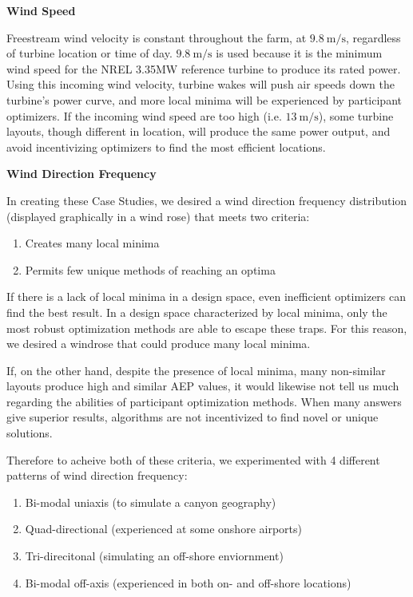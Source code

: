 \vspace{3mm}
\noindent\textbf{Wind Speed}

	\noindent Freestream wind velocity is constant throughout the farm, at $9.8\ \textrm{m/s}$, regardless of turbine location or time of day.
	$9.8\ \textrm{m/s}$ is used because it is the minimum wind speed for the NREL 3.35MW reference turbine to produce its rated power.
	Using this incoming wind velocity, turbine wakes will push air speeds down the turbine's power curve, and more local minima will be experienced by participant optimizers.
	If the incoming wind speed are too high (i.e. $13\ \textrm{m/s}$), some turbine layouts, though different in location, will produce the same power output, and avoid incentivizing optimizers to find the most efficient locations.

\vspace{3mm}
\noindent\textbf{Wind Direction Frequency}

	\noindent In creating these Case Studies, we desired a wind direction frequency distribution (displayed graphically in a wind rose) that meets two criteria:
	
	\begin{enumerate}
		\item Creates many local minima
		\item Permits few unique methods of reaching an optima
	\end{enumerate}
	
	If there is a lack of local minima in a design space, even inefficient optimizers can find the best result.
	In a design space characterized by local minima, only the most robust optimization methods are able to escape these traps.
	For this reason, we desired a windrose that could produce many local minima.
	
	If, on the other hand, despite the presence of local minima, many non-similar layouts produce high and similar AEP values, it would likewise not tell us much regarding the abilities of participant optimization methods.
	When many answers give superior results, algorithms are not incentivized to find novel or unique solutions. 
	
	Therefore to acheive both of these criteria, we experimented with 4 different patterns of wind direction frequency:

	\begin{enumerate}
		\item Bi-modal uniaxis (to simulate a canyon geography)
		\item Quad-directional (experienced at some onshore airports)
		\item Tri-direcitonal (simulating an off-shore enviornment)
		\item Bi-modal off-axis (experienced in both on- and off-shore locations)
	\end{enumerate}

